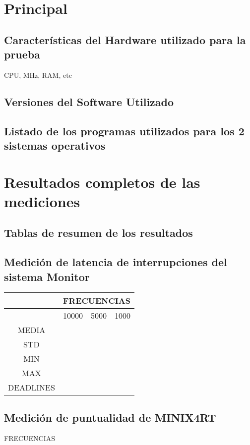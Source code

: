 \section{Principal}


\subsection{Características del Hardware utilizado para la prueba}
 CPU, MHz, RAM, etc

\subsection{Versiones del Software Utilizado}

\subsection{Listado de los programas utilizados para los 2 sistemas operativos}

\section{Resultados completos de las mediciones}

\subsection{Tablas de resumen de los resultados}


\subsection{Medición de latencia de interrupciones del sistema Monitor}
\begin{tabular}{|c|c|c|c|}
\hline
&\multicolumn{3}{|c|}{FRECUENCIAS}\\
\hline
&10000&5000&1000\\
\hline
MEDIA&&&\\
\hline
STD&&&\\
\hline
MIN&&&\\
\hline
MAX&&&\\
\hline
DEADLINES&&&\\
\hline
\end{tabular}


\subsection{Medición de puntualidad de MINIX4RT}
FRECUENCIAS

